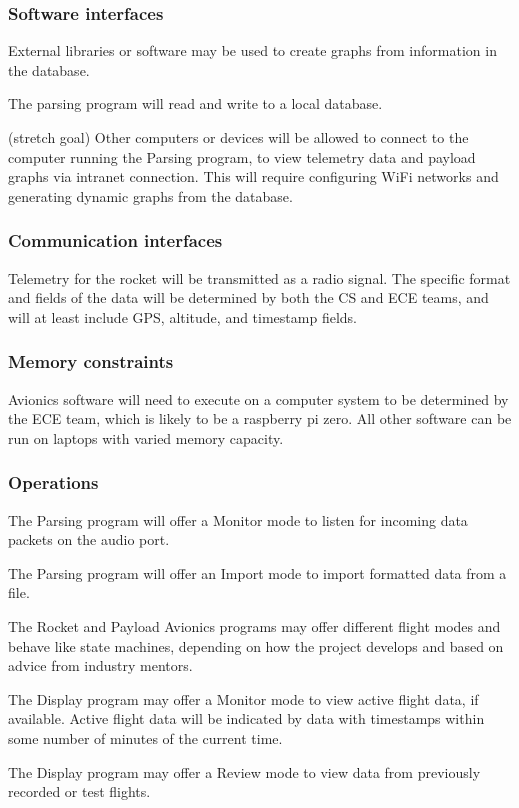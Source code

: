 \documentclass[onecolumn, draftclsnofoot, 10pt, compsoc]{IEEEtran}
\begin{document}
\subsubsection{Software interfaces}
External libraries or software may be used to create graphs from information in the database.

The parsing program will read and write to a local database.

(stretch goal) Other computers or devices will be allowed to connect to the computer running the Parsing program, to view telemetry data and payload graphs via intranet connection.  This will require configuring WiFi networks and generating dynamic graphs from the database.

\subsubsection{Communication interfaces}
Telemetry for the rocket will be transmitted as a radio signal.  The specific format and fields of the data will be determined by both the CS and ECE teams, and will at least include GPS, altitude, and timestamp fields.

\subsubsection{Memory constraints}
Avionics software will need to execute on a computer system to be determined by the ECE team, which is likely to be a raspberry pi zero. All other software can be run on laptops with varied memory capacity.

\subsubsection{Operations}
The Parsing program will offer a Monitor mode to listen for incoming data packets on the audio port.

The Parsing program will offer an Import mode to import formatted data from a file.

The Rocket and Payload Avionics programs may offer different flight modes and behave like state machines, depending on how the project develops and based on advice from industry mentors.

The Display program may offer a Monitor mode to view active flight data, if available.  Active flight data will be indicated by data with timestamps within some number of minutes of the current time.

The Display program may offer a Review mode to view data from previously recorded or test flights.
\end{document}
